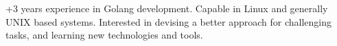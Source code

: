

\begin{cvparagraph}

+3 years experience in Golang development. Capable in Linux and generally UNIX based systems. Interested in devising a better approach for challenging tasks, and learning new technologies and tools. 
\end{cvparagraph}
